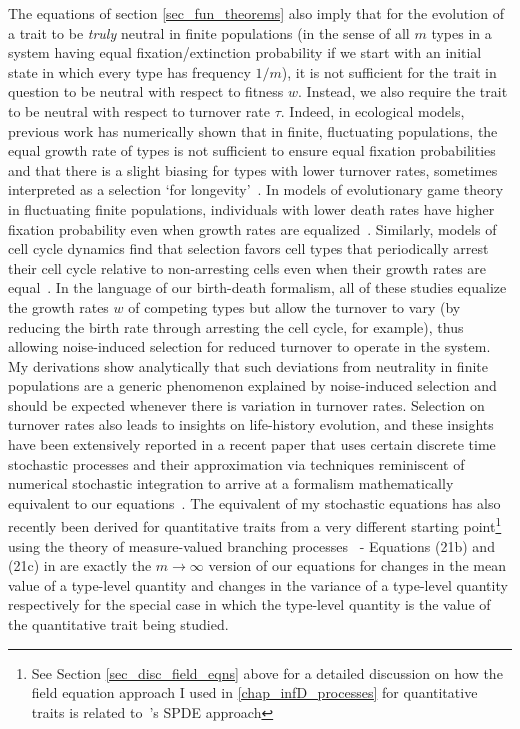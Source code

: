 The equations of section \ref{sec_fun_theorems} also imply that for the evolution of a trait to be \emph{truly} neutral in finite populations (in the sense of all $m$ types in a system having equal fixation/extinction probability if we start with an initial state in which every type has frequency $1/m$), it is not sufficient for the trait in question to be neutral with respect to fitness $w$. Instead, we also require the trait to be neutral with respect to turnover rate $\tau$.  Indeed, in ecological models, previous work has numerically shown that in finite, fluctuating populations, the equal growth rate of types is not sufficient to ensure equal fixation probabilities and that there is a slight biasing for types with lower turnover rates, sometimes interpreted as a selection `for longevity'~\citep{lin_features_2012, oliveira_advantage_2017,balasekaran_quasi-neutral_2022}. In models of evolutionary game theory in fluctuating finite populations, individuals with lower death rates have higher fixation probability even when growth rates are equalized~\citep{huang_stochastic_2015, czuppon_fixation_2018}. Similarly, models of cell cycle dynamics find that selection favors cell types that periodically arrest their cell cycle relative to non-arresting cells even when their growth rates are equal~\citep{wodarz_effect_2017}. In the language of our birth-death formalism, all of these studies equalize the growth rates $w$ of competing types but allow the turnover to vary (by reducing the birth rate through arresting the cell cycle, for example), thus allowing noise-induced selection for reduced turnover to operate in the system. My derivations show analytically that such deviations from neutrality in finite populations are a generic phenomenon explained by noise-induced selection and should be expected whenever there is variation in turnover rates. Selection on turnover rates also leads to insights on life-history evolution, and these insights have been extensively reported in a recent paper that uses certain discrete time stochastic processes and their approximation via techniques reminiscent of numerical stochastic integration to arrive at a formalism mathematically equivalent to our equations~\citep{kuosmanen_turnover_2022}. The equivalent of my stochastic equations has also recently been derived for quantitative traits from a very different starting point\footnote{See Section \ref{sec_disc_field_eqns} above for a detailed discussion on how the field equation approach I used in \ref{chap_infD_processes} for quantitative traits is related to~\cite{week_white_2021}'s SPDE approach} using the theory of measure-valued branching processes~\citep{week_white_2021} - Equations (21b) and (21c) in \cite{week_white_2021} are exactly the $m \to \infty$ version of our equations for changes in the mean value of a type-level quantity and changes in the variance of a type-level quantity respectively for the special case in which the type-level quantity is the value of the quantitative trait being studied.

